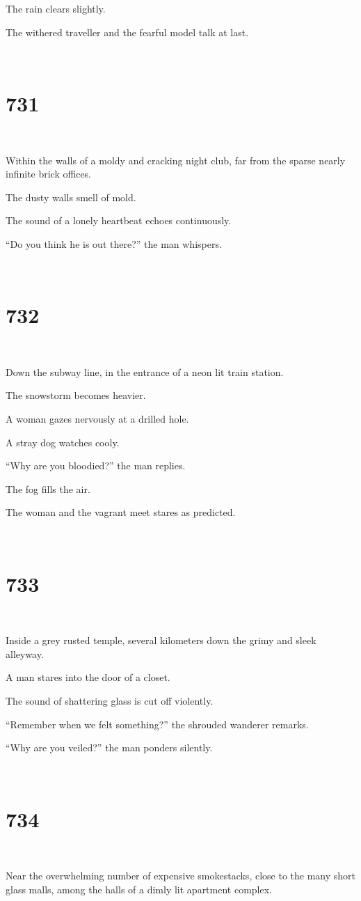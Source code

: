 \documentclass{report}
\begin{document}
The rain clears slightly.

The withered traveller and the fearful model talk at last.

~
\chapter*{731}
~

Within the walls of a moldy and cracking night club, far from the sparse nearly infinite brick offices.

The dusty walls smell of mold.

The sound of a lonely heartbeat echoes continuously.

``Do you think he is out there?'' the man whispers.

~
\chapter*{732}
~

Down the subway line, in the entrance of a neon lit train station.

The snowstorm becomes heavier.

A woman gazes nervously at a drilled hole.

A stray dog watches cooly.

``Why are you bloodied?'' the man replies.

The fog fills the air.

The woman and the vagrant meet stares as predicted.

~
\chapter*{733}
~

Inside a grey rusted temple, several kilometers down the grimy and sleek alleyway.

A man stares into the door of a closet.

The sound of shattering glass is cut off violently.

``Remember when we felt something?'' the shrouded wanderer remarks.

``Why are you veiled?'' the man ponders silently.

~
\chapter*{734}
~

Near the overwhelming number of expensive smokestacks, close to the many short glass malls, among the halls of a dimly lit apartment complex.
\end{document}
